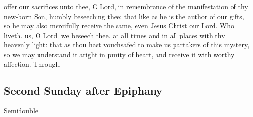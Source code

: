 \secret
{} offer our sacrifices unto thee, O Lord, in remembrance of the manifestation of thy new-born Son, humbly beseeching thee: that like as he is the author of our gifts, so he may also mercifully receive the same, even Jesus Christ our Lord. Who liveth.
\postcommunion
{} us, O Lord, we beseech thee, at all times and in all places with thy heavenly light: that as thou hast vouchsafed to make us partakers of this mystery, so we may understand it aright in purity of heart, and receive it with worthy affection. Through.


\clearpage
\subsection{Second Sunday after Epiphany}\label{EpiphanyII}
\feastdate{}{}
\begin{inhead}
{Semidouble}
\end{inhead}


